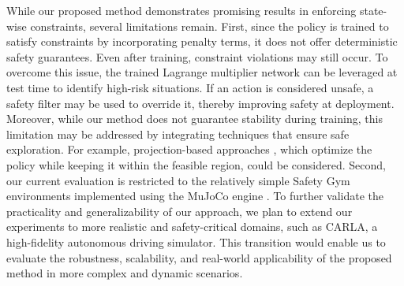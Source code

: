 While our proposed method demonstrates promising results in enforcing state-wise constraints, several limitations remain.
First, since the policy is trained to satisfy constraints by incorporating penalty terms, it does not offer deterministic safety guarantees.
Even after training, constraint violations may still occur.
To overcome this issue, the trained Lagrange multiplier network can be leveraged at test time to identify high-risk situations.
If an action is considered unsafe, a safety filter may be used to override it, thereby improving safety at deployment.
Moreover, while our method does not guarantee stability during training, this limitation may be addressed by integrating techniques that ensure safe exploration.
For example, projection-based approaches \cite{CPO, PCPO}, which optimize the policy while keeping it within the feasible region, could be considered.
Second, our current evaluation is restricted to the relatively simple Safety Gym environments implemented using the MuJoCo engine \cite{MuJoCo}.
To further validate the practicality and generalizability of our approach, we plan to extend our experiments to more realistic and safety-critical domains, such as CARLA, a high-fidelity autonomous driving simulator.
This transition would enable us to evaluate the robustness, scalability, and real-world applicability of the proposed method in more complex and dynamic scenarios.